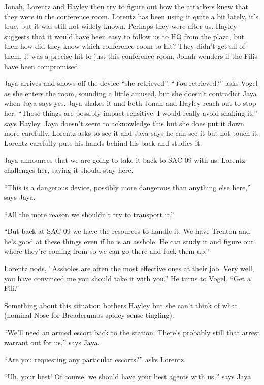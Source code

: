 Jonah, Lorentz and Hayley then try to figure out how the attackers knew that they were in the conference room.  Lorentz has been using it quite a bit lately, it's true, but it was still not widely known.   Perhaps they were after us.  Hayley suggests that it would have been easy to follow us to HQ from the plaza, but then how did they know which conference room to hit?  They didn't get all of them, it was a precise hit to just this conference room.  Jonah wonders if the Filis have been compromised.



Jaya arrives and shows off the device ``she retrieved''.   ``\textit{You} retrieved?'' asks Vogel as she enters the room, sounding a little amused, but she doesn't contradict Jaya when Jaya says yes.  Jaya shakes it and both Jonah and Hayley reach out to stop her.  ``Those things are possibly impact sensitive, I would really avoid shaking it,'' says Hayley.  Jaya doesn't seem to acknowledge this but she does put it down more carefully.  Lorentz asks to see it and Jaya says he can see it but not touch it.  Lorentz carefully puts his hands behind his back and studies it. 



Jaya announces that we are going to take it back to SAC-09 with us.  Lorentz challenges her, saying it should stay here.  

``This is a dangerous device, possibly more dangerous than anything else here,'' says Jaya.

``All the more reason we shouldn't try to transport it.''

``But back at SAC-09 we have the resources to handle it.  We have Trenton and he's good at these things even if he is an asshole.  He can study it and figure out where they're coming from so we can go there and fuck them up.''

Lorentz nods, ``Assholes are often the most effective ones at their job.  Very well, you have convinced me you should take it with you.''  He turns to Vogel.  ``Get a Fili.''

Something about this situation bothers Hayley but she can't think of what (nominal Nose for Breadcrumbs spidey sense tingling).

``We'll need an armed escort back to the station.  There's probably still that arrest warrant out for us,'' says Jaya.

``Are you requesting any particular escorts?'' asks Lorentz.

``Uh, your best!  Of course, we should have your best agents with us,'' says Jaya

